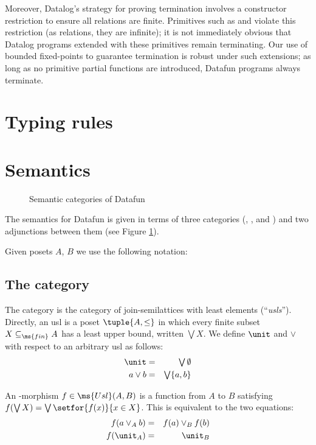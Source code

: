 \documentclass[preprint]{sigplanconf}
\begin{document}
\TODO Moreover, Datalog's strategy for proving termination involves a
constructor restriction to ensure all relations are finite. Primitives such as
 and  violate this restriction (as relations, they are
infinite); it is not immediately obvious that Datalog programs extended with
these primitives remain terminating. Our use of bounded fixed-points to
guarantee termination is robust under such extensions; as long as no primitive
partial functions are introduced, Datafun programs always terminate.


\section{Typing rules}


\section{Semantics}

\begin{figure}
  \label{fig:semcats}
  \caption{Semantic categories of Datafun}
\end{figure}

The semantics for Datafun is given in terms of three categories (,
, and ) and two adjunctions between them (see Figure
\ref{fig:semcats}).

Given posets $A$, $B$ we use the following notation: \TODO

\subsection{The category }

The category  is the category of join-semilattices with least elements
(``\emph{usls}''). Directly, an usl is a poset $\tuple{A, \le}$ in which every
finite subset $X \subseteq_{\ms{fin}} A$ has a least upper bound, written
$\bigvee X$. We define $\unit$ and $\vee$ with respect to an arbitrary usl as
follows:
\begin{eqnarray*}
  \unit &=& \textstyle\bigvee \emptyset\\
  a \vee b &=& \textstyle\bigvee \{a,b\}
\end{eqnarray*}

An -morphism $f \in \ms{Usl}(A,B)$ is a function from $A$ to $B$
satisfying $f(\bigvee X) = \bigvee \setfor{f(x)}{x \in X}$. This is equivalent
to the two equations:
\begin{eqnarray*}
  f(a \vee_A b) &=& f(a) \vee_B f(b)\\
  f(\unit_A) &=& \unit_B
\end{eqnarray*}
\end{document}
